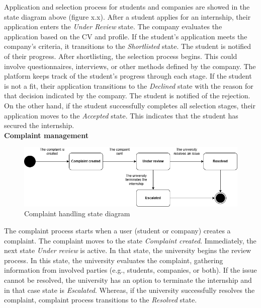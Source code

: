 Application and selection process for students and companies are showed in the state diagram above (figure x.x). After a student applies for an internship, their application enters the \textit{Under Review} state. The company evaluates the application based on the CV and profile. If the student’s application meets the company’s criteria, it transitions to the \textit{Shortlisted} state. The student is notified of their progress. After shortlisting, the selection process begins. This could involve questionnaires, interviews, or other methods defined by the company. The platform keeps track of the student's progress through each stage. If the student is not a fit, their application transitions to the \textit{Declined} state with the reason for that decision indicated by the company. The student is notified of the rejection. On the other hand, if the student successfully completes all selection stages, their application moves to the \textit{Accepted} state. This indicates that the student has secured the internship. \\

\textbf{Complaint management}\\
\begin{figure}[H]
	\includegraphics[width=\textwidth,height=\textheight,keepaspectratio]{RASD-Latex/assets/state_diagram_3.png}
	\caption{Complaint handling state diagram}
	\label{fig:DataRequest}
\end{figure}

The complaint process starts when a user (student or company) creates a complaint. The complaint moves to the state \textit{Complaint created}. Immediately, the next state \textit{Under review} is active. In that state, the university begins the review process. In this state, the university evaluates the complaint, gathering information from involved parties (e.g., students, companies, or both). If the issue cannot be resolved, the university has an option to terminate the internship and in that case state is \textit{Escalated}. Whereas, if the university successfully resolves the complaint, complaint process transitions to the \textit{Resolved} state.



